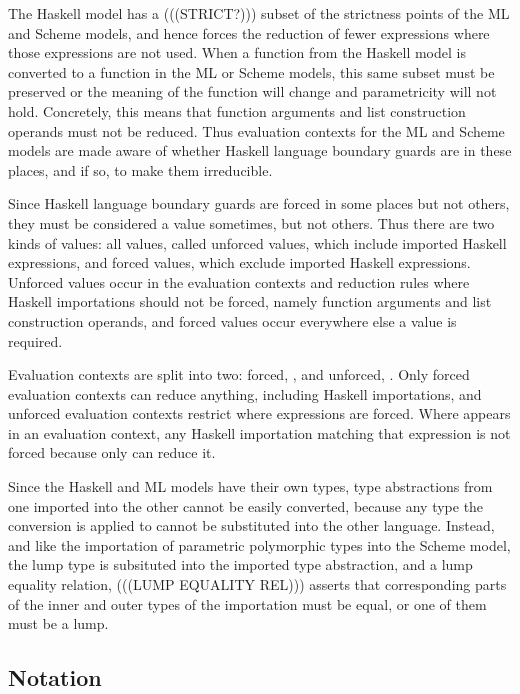 The Haskell model has a (((STRICT?))) subset of the strictness points of the ML and Scheme models, and hence forces the reduction of fewer expressions where those expressions are not used. When a function from the Haskell model is converted to a function in the ML or Scheme models, this same subset must be preserved or the meaning of the function will change and parametricity will not hold. Concretely, this means that function arguments and list construction operands must not be reduced. Thus evaluation contexts for the ML and Scheme models are made aware of whether Haskell language boundary guards are in these places, and if so, to make them irreducible.

Since Haskell language boundary guards are forced in some places but not others, they must be considered a value sometimes, but not others. Thus there are two kinds of values: all values, called unforced values, which include imported Haskell expressions, and forced values, which exclude imported Haskell expressions. Unforced values occur in the evaluation contexts and reduction rules where Haskell importations should not be forced, namely function arguments and list construction operands, and forced values occur everywhere else a value is required.

Evaluation contexts are split into two: forced, \varconf, and unforced, \varconu. Only forced evaluation contexts can reduce anything, including Haskell importations, and unforced evaluation contexts restrict where expressions are forced. Where \varconu appears in an evaluation context, any Haskell importation matching that expression is not forced because only \varconf can reduce it.

Since the Haskell and ML models have their own types, type abstractions from one imported into the other cannot be easily converted, because any type the conversion is applied to cannot be substituted into the other language. Instead, and like the importation of parametric polymorphic types into the Scheme model, the lump type is subsituted into the imported type abstraction, and a lump equality relation, (((LUMP EQUALITY REL))) asserts that corresponding parts of the inner and outer types of the importation must be equal, or one of them must be a lump.



\subsection{Notation}

